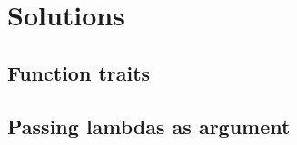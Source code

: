 \documentclass{scrartcl}
\newcommand{\inputcpplisting}[1]{}
\begin{document}
\newpage

\section{Solutions}

\subsection{Function traits}
\inputcpplisting{snippet21}

\newpage

\subsection{Passing lambdas as argument}
\inputcpplisting{snippet20}
\end{document}
